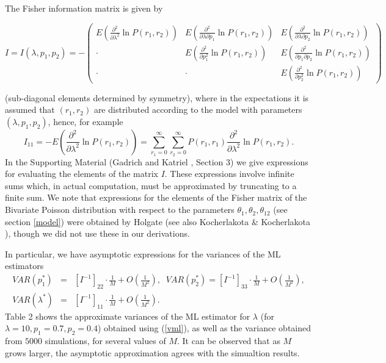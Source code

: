 \documentclass[a4paper,10pt,twoside]{article}
\begin{document}
The Fisher information matrix is given by
 \begin{small}
 $$I=I(\lambda,p_1,p_2)=-\left(\begin{array}{ccc}
E\left(\frac{\partial^2}{\partial \lambda^2 }\ln P(r_1,r_2) \right) & E\left(\frac{\partial^2}{\partial \lambda \partial p_1 }\ln P(r_1,r_2)\right) &  E\left(\frac{\partial^2}{\partial \lambda \partial p_2 }\ln P(r_1,r_2)\right)\\ 
\cdot  & E\left(\frac{\partial^2}{ \partial p_1^2 }\ln P(r_1,r_2)\right) &  E\left(\frac{\partial^2}{\partial p_1 \partial p_2 }\ln P(r_1,r_2)\right)\\ 
\cdot & \cdot &  E\left(\frac{\partial^2}{ \partial p_2^2 }\ln P(r_1,r_2)\right)
 \end{array}  \right)$$
 \end{small}
(sub-diagonal elements determined by symmetry), where in the expectations it is assumed that $(r_1,r_2)$ are distributed according to 
the model with parameters $(\lambda,p_1,p_2)$, hence, for example
$$I_{11}=-E\left(\frac{\partial^2}{\partial \lambda^2 }\ln P(r_1,r_2) \right)= \sum_{r_1=0}^\infty \sum_{r_2=0}^\infty P(r_1,r_1)\frac{\partial^2}{\partial \lambda^2 }\ln P(r_1,r_2).$$
In the Supporting Material (Gadrich and Katriel \cite{gadrich}, Section 3) we give expressions for evaluating the elements of the matrix $I$. These 
expressions involve infinite sums which, in actual computation, must be approximated by truncating to a finite sum.
We note that expressions for the elements of the Fisher matrix of the Bivariate Poisson distribution with respect to the  
parameters $\theta_1,\theta_2,\theta_{12}$ (see section \ref{model}) were obtained by Holgate \cite{holgate} (see also Kocherlakota \& Kocherlakota \cite{kocherlakota}), though we did not use these in our derivations.

In particular, we have asymptotic expressions for the variances of the ML estimators
\begin{eqnarray}\label{vml}VAR(p_1^*)&=&[I^{-1}]_{22}\cdot \frac{1}{M}+O\left(\frac{1}{M^2} \right),\;\;VAR(p_2^*)=[I^{-1}]_{33}\cdot \frac{1}{M}+O\left(\frac{1}{M^2} \right),\nonumber\\
VAR(\lambda^*)&=&[I^{-1}]_{11}\cdot \frac{1}{M}+O\left(\frac{1}{M^2} \right).
\end{eqnarray}
Table 2 shows the approximate variances of the ML estimator for $\lambda$ (for $\lambda=10,p_1=0.7,p_2=0.4$) obtained using (\ref{vml}), as well as the variance obtained from $5000$ simulations, for several values of $M$. It can be observed that as $M$
grows larger, the asymptotic approximation agrees with the simualtion results. 
\end{document}
